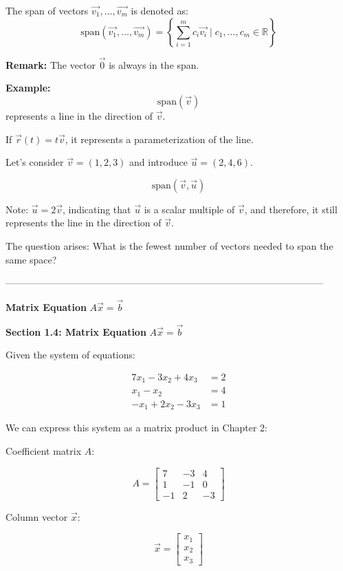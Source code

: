\documentclass{article}
\begin{document}
The span of vectors \( \vec{v_1}, \ldots, \vec{v_m} \) is denoted as:
\[ \text{span}(\vec{v_1}, \ldots, \vec{v_m}) = \left\{ \sum_{i=1}^{m} c_i\vec{v_i} \mid c_1, \ldots, c_m \in \mathbb{R} \right\} \]

\textbf{Remark:} The vector \( \vec{0} \) is always in the span.

\textbf{Example:}
\[ \text{span}(\vec{v}) \] represents a line in the direction of \( \vec{v} \).


If \( \vec{r}(t) = t\vec{v} \), it represents a parameterization of the line.

Let's consider \( \vec{v} = (1, 2, 3) \) and introduce \( \vec{u} = (2, 4, 6) \).

\[ \text{span}(\vec{v}, \vec{u}) \]

Note: \( \vec{u} = 2\vec{v} \), indicating that \( \vec{u} \) is a scalar multiple of \( \vec{v} \), and therefore, it still represents the line in the direction of \( \vec{v} \).

The question arises: What is the fewest number of vectors needed to span the same space?


---------------------------------------------------------------------------------------------------

\textbf{Matrix Equation} \( A\vec{x} = \vec{b} \)

\textbf{Section 1.4: Matrix Equation} \(A\vec{x} = \vec{b}\)

Given the system of equations:

\[
\begin{aligned}
7x_1 - 3x_2 + 4x_3 &= 2 \\
x_1 - x_2 &= 4 \\
-x_1 + 2x_2 - 3x_3 &= 1
\end{aligned}
\]

We can express this system as a matrix product in Chapter 2:

Coefficient matrix \(A\):

\[
A = \begin{bmatrix}
7 & -3 & 4 \\
1 & -1 & 0 \\
-1 & 2 & -3
\end{bmatrix}
\]

Column vector \(\vec{x}\):

\[
\vec{x} = \begin{bmatrix}
x_1 \\
x_2 \\
x_3
\end{bmatrix}
\]
\end{document}
